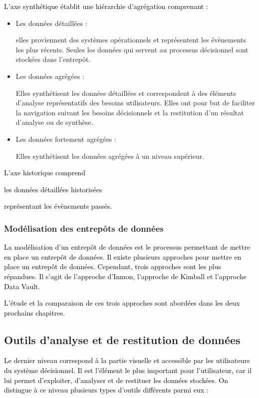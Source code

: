 \documentclass[a4paper,12pt]{report}
\begin{document}
\textcolor{black}{L’axe synthétique établit une hiérarchie d’agrégation comprenant \citep{inmon2002building} :}


\begin{itemize}
	\item  \begin{bf}Les données détaillées : \end{bf} elles proviennent des systèmes opérationnels et représentent les évènements les plus récents. Seules les données qui servent au processus décisionnel sont stockées dans l’entrepôt.
	\item  \begin{bf}Les données agrégées : \end{bf}Elles synthétisent les données détaillées et correspondent à des éléments d’analyse représentatifs des besoins utilisateurs. Elles ont pour but de faciliter la navigation suivant les besoins décisionnels et la restitution d’un résultat d’analyse ou de synthèse.
	\item  \begin{bf}Les données fortement agrégées : \end{bf}Elles synthétisent les données agrégées à un niveau supérieur.
	\end{itemize}


\textcolor{black}{L’axe historique comprend \begin{bf} les données détaillées historisées \end{bf}représentant les évènements passés.}

\subsubsection{Modélisation des entrepôts de données}
\textcolor{black}{La modélisation d’un entrepôt de données est le processus permettant de mettre en place un entrepôt de données. Il existe plusieurs approches pour mettre en place un entrepôt de données. Cependant, trois approches sont les plus répandues. Il s’agit de l’approche d’Inmon, l’approche de Kimball et l’approche Data Vault.}

\textcolor{black}{L’étude et la comparaison de ces trois approches sont abordées dans les deux prochains chapitres.}

\subsection{Outils d’analyse et de restitution de données}
\textcolor{black}{Le dernier niveau correspond à la partie visuelle et accessible par les utilisateurs du système décisionnel. Il est l’élément le plus important pour l’utilisateur, car il lui permet d’exploiter, d’analyser et de restituer les données stockées. On distingue à ce niveau plusieurs types d’outils différents parmi eux :}
\end{document}
